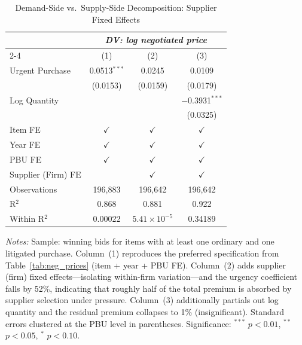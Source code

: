\begin{table}[ht]
  \centering
  \caption{Demand-Side vs.\ Supply-Side Decomposition: Supplier Fixed Effects}
  \label{tab:supplier_fe}
  \small
  \begin{threeparttable}
  \begin{tabular}{lccc}
    \toprule
    & \multicolumn{3}{c}{\textit{DV: log negotiated price}} \\
    \cmidrule(lr){2-4}
                           & (1)            & (2)            & (3)            \\
    \midrule
    Urgent Purchase        & 0.0513$^{***}$ & 0.0245         & 0.0109         \\
                           & (0.0153)       & (0.0159)       & (0.0179)       \\[3pt]
    Log Quantity           &                &                & $-$0.3931$^{***}$ \\
                           &                &                & (0.0325)       \\
    \midrule
    Item FE                & $\checkmark$   & $\checkmark$   & $\checkmark$   \\
    Year FE                & $\checkmark$   & $\checkmark$   & $\checkmark$   \\
    PBU FE                 & $\checkmark$   & $\checkmark$   & $\checkmark$   \\
    Supplier (Firm) FE     &                & $\checkmark$   & $\checkmark$   \\[3pt]
    Observations           & 196{,}883      & 196{,}642      & 196{,}642      \\
    R$^2$                  & 0.868          & 0.881          & 0.922          \\
    Within R$^2$           & 0.00022        & $5.41\!\times\!10^{-5}$ & 0.34189 \\
    \bottomrule
  \end{tabular}
  \begin{tablenotes}
    \small
    \item \textit{Notes:} Sample: winning bids for items with at least one
    ordinary and one litigated purchase. Column~(1) reproduces the preferred
    specification from Table~\ref{tab:neg_prices} (item + year + PBU FE).
    Column~(2) adds supplier (firm) fixed effects---isolating within-firm
    variation---and the urgency coefficient falls by 52\%, indicating that
    roughly half of the total premium is absorbed by supplier selection
    under pressure. Column~(3) additionally partials out log quantity and
    the residual premium collapses to 1\% (insignificant). Standard errors
    clustered at the PBU level in parentheses. Significance: $^{***}$
    $p<0.01$, $^{**}$ $p<0.05$, $^{*}$ $p<0.10$.
  \end{tablenotes}
  \end{threeparttable}
\end{table}
